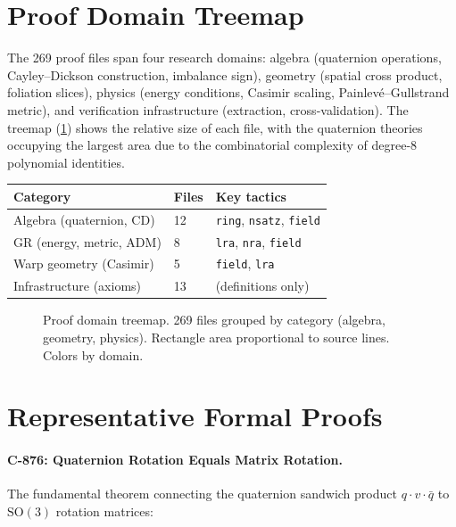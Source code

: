 \documentclass[12pt,openany]{report}
\theoremstyle{definition}
\theoremstyle{plain}
\theoremstyle{remark}
\newcommand{\prooffilecount}{269}
\begin{document}
\section{Proof Domain Treemap}

The \prooffilecount{} proof files span four research domains:
algebra (quaternion operations, Cayley--Dickson construction,
imbalance sign), geometry (spatial cross product, foliation slices),
physics (energy conditions, Casimir scaling, Painlev\'{e}--Gullstrand
metric), and verification infrastructure (extraction, cross-validation).
The treemap (\cref{fig:proof-treemap}) shows the relative size of each
file, with the quaternion theories occupying the largest area due to the
combinatorial complexity of degree-8 polynomial identities.

\begin{center}
\begin{tabular}{lll}
\toprule
\textbf{Category} & \textbf{Files} & \textbf{Key tactics} \\
\midrule
Algebra (quaternion, CD) & 12 & \texttt{ring}, \texttt{nsatz}, \texttt{field} \\
GR (energy, metric, ADM) & 8 & \texttt{lra}, \texttt{nra}, \texttt{field} \\
Warp geometry (Casimir) & 5 & \texttt{field}, \texttt{lra} \\
Infrastructure (axioms) & 13 & (definitions only) \\
\bottomrule
\end{tabular}
\end{center}

\begin{figure}[htbp]
\centering

\caption{Proof domain treemap.  \prooffilecount{} files grouped by
category (algebra, geometry, physics).  Rectangle area proportional
to source lines.  Colors by domain.}
\label{fig:proof-treemap}
\end{figure}

\section{Representative Formal Proofs}

\paragraph{C-876: Quaternion Rotation Equals Matrix Rotation.}
The fundamental theorem connecting the quaternion sandwich product
$q \cdot v \cdot \bar{q}$ to $\mathrm{SO}(3)$ rotation matrices:
\end{document}
